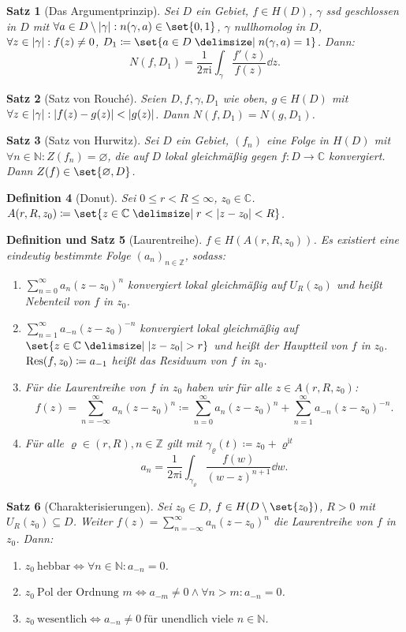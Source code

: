 \documentclass[a4paper]{article}
\newcounter{Sec}
\theoremstyle{marginbreak}
\newtheorem{definition}{Definition}[Sec]
\newtheorem{satz}[definition]{Satz}
\newtheorem{defsatz}[definition]{Definition und Satz}
\newcommand{\C}{\mathbb{C}}
\renewcommand{\i}{\mathrm{i}}
\begin{document}
	\begin{satz}[Das Argumentprinzip]
		Sei $D$ ein Gebiet, $f\in H(D)$, $\gamma$ ssd geschlossen in $D$ mit $\forall a\in D\setminus\abs{\gamma}: n(\gamma, a)\in\set{0, 1}$,
		$\gamma$ nullhomolog in $D$, $\forall z\in\abs{\gamma}:f(z)\neq 0$, $D_1\coloneqq\set{a\in D\given n(\gamma, a)=1}$. Dann:
		\[
			N(f, D_1)=\frac{1}{2\pi\i}\int_\gamma\frac{f'(z)}{f(z)}\dd{z}.
		\]
	\end{satz}
	\begin{satz}[Satz von Rouché]
		Seien $D, f, \gamma, D_1$ wie oben, $g\in H(D)$ mit $\forall z\in\abs{\gamma}: \abs{f(z)-g(z)}<\abs{g(z)}$.
		Dann $N(f, D_1)=N(g, D_1)$.
	\end{satz}
	\begin{satz}[Satz von Hurwitz]
		Sei $D$ ein Gebiet, $(f_n)$ eine Folge in $H(D)$ mit $\forall n\in\mathbb{N}:Z(f_n)=\varnothing$,
		die auf $D$ lokal gleichmäßig gegen $f\colon D\to\C$ konvergiert. Dann $Z(f)\in\set{\varnothing, D}$.
	\end{satz}
	\begin{definition}[Donut]
		Sei $0\leq r<R\leq \infty$, $z_0\in\C$. $A(r, R, z_0)\coloneqq\set{z\in\C\given r<\abs{z-z_0}<R}$.
	\end{definition}
	\begin{defsatz}[Laurentreihe]
		$f\in H(A(r, R, z_0))$. Es existiert eine eindeutig bestimmte Folge $(a_n)_{n\in\mathbb{Z}}$, sodass:
		\begin{enumerate}[label=(\alph*)]
			\item $\sum_{n=0}^\infty a_n(z-z_0)^n$ konvergiert lokal gleichmäßig auf $U_R(z_0)$ und heißt
				Nebenteil von $f$ in $z_0$.
			\item $\sum_{n=1}^\infty a_{-n}(z-z_0)^{-n}$ konvergiert lokal gleichmäßig auf $\set{z\in\C\given\abs{z-z_0}>r}$
				und heißt der Hauptteil von $f$ in $z_0$. $\Res(f, z_0)\coloneqq a_{-1}$ heißt das Residuum von $f$ in $z_0$.
			\item Für die Laurentreihe von $f$ in $z_0$ haben wir für alle $z\in A(r, R, z_0)$:
				\[
					f(z)=\sum_{n=-\infty}^\infty a_n(z-z_0)^n\coloneqq \sum_{n=0}^\infty a_n(z-z_0)^n+\sum_{n=1}^\infty a_{-n}(z-z_0)^{-n}.
				\]
			\item Für alle $\varrho\in(r, R), n\in\mathbb{Z}$ gilt mit $\gamma_\varrho(t)\coloneqq z_0+\varrho^{\i t}$
				\[
					a_n=\frac{1}{2\pi\i}\int_{\gamma_\varrho}\frac{f(w)}{(w-z)^{n+1}}\dd{w}.
				\]
		\end{enumerate}
	\end{defsatz}
	\begin{satz}[Charakterisierungen]
		Sei $z_0\in D$, $f\in H(D\setminus\set{z_0})$, $R>0$ mit $U_R(z_0)\subseteq D$. Weiter
		$f(z)=\sum_{n=-\infty}^\infty a_n(z-z_0)^n$ die Laurentreihe von $f$ in $z_0$. Dann:
		\begin{enumerate}[label=(\alph*)]
			\item $z_0~\text{hebbar}\iff\forall n\in\mathbb{N}: a_{-n}=0$.
			\item $z_0~\text{Pol der Ordnung $m$}\iff a_{-m}\neq 0\wedge\forall n>m: a_{-n}=0$.
			\item $z_0~\text{wesentlich}\iff a_{-n}\neq 0~\text{für unendlich viele $n\in\mathbb{N}$}$.
		\end{enumerate}
	\end{satz}
\end{document}
